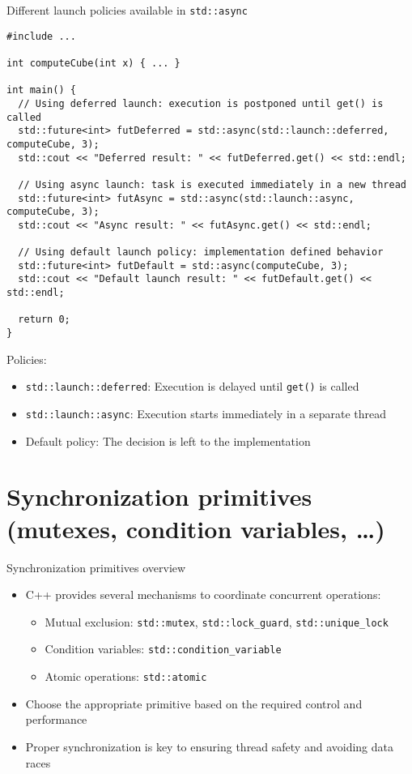 \documentclass{beamer}
\begin{document}
\begin{frame}[fragile]{Different launch policies available in \texttt{std::async}}
  \lstset{style=CStyle}
  \begin{lstlisting}
#include ...

int computeCube(int x) { ... }

int main() {
  // Using deferred launch: execution is postponed until get() is called
  std::future<int> futDeferred = std::async(std::launch::deferred, computeCube, 3);
  std::cout << "Deferred result: " << futDeferred.get() << std::endl;
  
  // Using async launch: task is executed immediately in a new thread
  std::future<int> futAsync = std::async(std::launch::async, computeCube, 3);
  std::cout << "Async result: " << futAsync.get() << std::endl;
  
  // Using default launch policy: implementation defined behavior
  std::future<int> futDefault = std::async(computeCube, 3);
  std::cout << "Default launch result: " << futDefault.get() << std::endl;
  
  return 0;
}
  \end{lstlisting}
  Policies:
  \begin{itemize}
    \item \texttt{std::launch::deferred}: Execution is delayed until \texttt{get()} is called
    \item \texttt{std::launch::async}: Execution starts immediately in a separate thread
    \item Default policy: The decision is left to the implementation
  \end{itemize}
\end{frame}

\section{Synchronization primitives (mutexes, condition variables, \dots)}

\begin{frame}{Synchronization primitives overview}
  \begin{itemize}
    \item C++ provides several mechanisms to coordinate concurrent operations:
      \begin{itemize}
        \item Mutual exclusion: \texttt{std::mutex}, \texttt{std::lock\_guard}, \texttt{std::unique\_lock}
        \item Condition variables: \texttt{std::condition\_variable}
        \item Atomic operations: \texttt{std::atomic}
      \end{itemize}
    \item Choose the appropriate primitive based on the required control and performance
    \item Proper synchronization is key to ensuring thread safety and avoiding data races
  \end{itemize}
\end{frame}
\end{document}
